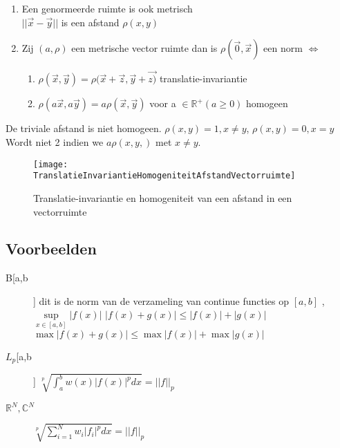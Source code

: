 \begin{enumerate}
\item Een genormeerde ruimte is ook metrisch \\
$||\vec{x}-\vec{y}||$ is een afstand $\rho(x,y)$
\item Zij $(a,\rho)$ een metrische vector ruimte dan is $\rho(\vec{0},\vec{x})$ een norm $\iff$
\begin{enumerate}
\item $\rho(\vec{x},\vec{y})=\rho(\vec{x}+\vec{z},\vec{y}+\vec{z)}$ translatie-invariantie
\item $\rho(a\vec{x},a\vec{y})=a\rho(\vec{x},\vec{y}) $ voor a $\in \mathbb{R}^+ (a \geq 0)$  homogeen
\end{enumerate}
\end{enumerate}
De triviale afstand is niet homogeen. $\rho(x,y) = 1, x \neq y$, $\rho(x,y) = 0, x = y$ Wordt niet 2 indien we $a \rho(x,y,)$ met $x \neq y$.



\begin{figure}[h]
	\centering
	\texttt{[image: TranslatieInvariantieHomogeniteitAfstandVectorruimte]}
	\caption{Translatie-invariantie en homogeniteit van een afstand in een vectorruimte}
\end{figure}

\subsection{Voorbeelden}
\begin{description}
\item[B[a,b]] dit is de norm van de verzameling van continue functies op $[a,b]$ , $ \underset{x\in[a,b]}{\operatorname{sup}} |f(x)|$
$ |f(x)+g(x)| \leq |f(x)|+|g(x)| $ \\
$\operatorname {max}|f(x)+g(x)| \leq \operatorname {max}|f(x)|+ \operatorname {max} |g(x)| $
\item[$L_p$[a,b]] $\sqrt[p]{\int_a^b w(x)|f(x)|^p dx}=||f||_p$
\item[$\mathbb{R}^N,\mathbb{C}^N$] $\sqrt[p]{\sum_{i=1}^N w_i|f_i|^p dx}=||f||_p$
\end{description}

